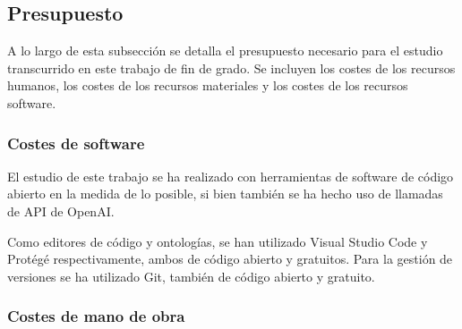 \subsection{Presupuesto}
A lo largo de esta subsección se detalla el presupuesto necesario para el estudio transcurrido en este trabajo de fin de grado. Se incluyen los costes de los recursos humanos, los costes de los recursos materiales y los costes de los recursos software.

\subsubsection{Costes de software}
El estudio de este trabajo se ha realizado con herramientas de software de código abierto en la medida de lo posible, si bien también se ha hecho uso de llamadas de API de OpenAI.

Como editores de código y ontologías, se han utilizado Visual Studio Code y Protégé respectivamente, ambos de código abierto y gratuitos. Para la gestión de versiones se ha utilizado Git, también de código abierto y gratuito.


\subsubsection{Costes de mano de obra}
